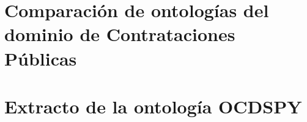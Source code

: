 \begin{appendices}
\chapter{Comparación de ontologías del dominio de Contrataciones Públicas}
\label{chap:comparaciondeOntologias}


\chapter{Extracto de la ontología OCDSPY}


\end{appendices}